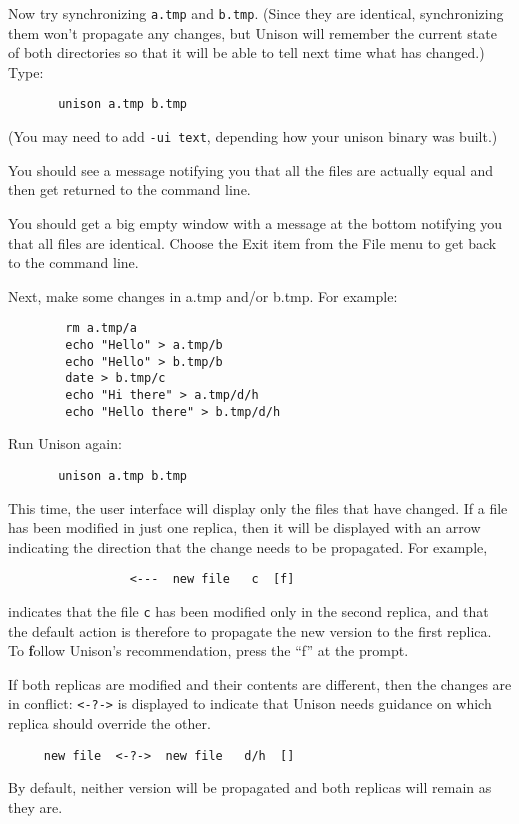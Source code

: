 \documentclass{article}
\begin{document}
Now try synchronizing {\tt a.tmp} and {\tt b.tmp}.  (Since they are
identical, synchronizing them won't propagate any changes, but Unison
will remember the current state of both directories so that it will be
able to tell next time what has changed.)  Type:
\begin{verbatim}
       unison a.tmp b.tmp
\end{verbatim}
(You may need to add \verb|-ui text|, depending how your unison binary was built.)

\begin{textui}
You should see a message notifying you that all the files are actually
equal and then get returned to the command line.
\end{textui}

\begin{tkui}
You should get a big empty window with a message at the bottom
notifying you that all files are identical.  Choose the Exit item from
the File menu to get back to the command line.
\end{tkui}

Next, make some changes in a.tmp and/or b.tmp.  For example:
\begin{verbatim}
        rm a.tmp/a
        echo "Hello" > a.tmp/b
        echo "Hello" > b.tmp/b
        date > b.tmp/c
        echo "Hi there" > a.tmp/d/h
        echo "Hello there" > b.tmp/d/h
\end{verbatim}
Run Unison again:
\begin{verbatim}
       unison a.tmp b.tmp
\end{verbatim}

This time, the user interface will display only the files that have
changed.  If a file has been modified in just one
replica, then it will be displayed with an arrow indicating the
direction that the change needs to be propagated.  For example,
\begin{verbatim}
                 <---  new file   c  [f]
\end{verbatim}
\noindent
indicates that the file {\tt c} has been modified only in the second
replica, and that the default action is therefore to propagate the new
version to the first replica.  To {\bf f}ollow Unison's recommendation,
press the ``f'' at the prompt.

If both replicas are modified and their contents are different, then
the changes are in conflict: \texttt{<-?->} is displayed to indicate
that Unison needs guidance on which replica should override the
other.
\begin{verbatim}
     new file  <-?->  new file   d/h  []
\end{verbatim}
By default, neither version will be propagated and both
replicas will remain as they are.
\end{document}
